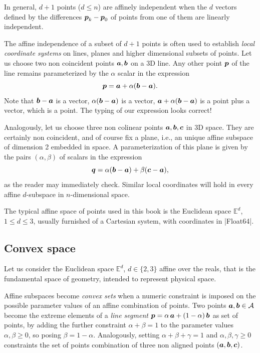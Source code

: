 In general, $d+1$ points  ($d \leq n$) are affinely independent when the $d$ vectors defined by the differences ${\mbox{\boldmath $p$}}_k - {\mbox{\boldmath $p$}}_0$ of points from one of them are linearly independent. 

The affine independence of a subset of $d+1$ points is often used to establish \emph{local coordinate systems} on lines, planes and higher dimensional subsets of points. Let us choose two non coincident points ${\mbox{\boldmath $a$}},{\mbox{\boldmath $b$}}$ on a 3D line. Any other point ${\mbox{\boldmath $p$}}$ of the line remains parameterized by the $\alpha$ scalar in the expression 
\[
{\mbox{\boldmath $p$}} = {\mbox{\boldmath $a$}} + \alpha({\mbox{\boldmath $b$}}-{\mbox{\boldmath $a$}}). 
\]
Note that ${\mbox{\boldmath $b$}}-{\mbox{\boldmath $a$}}$ is a vector, $\alpha({\mbox{\boldmath $b$}}-{\mbox{\boldmath $a$}})$ is a vector, ${\mbox{\boldmath $a$}} + \alpha({\mbox{\boldmath $b$}}-{\mbox{\boldmath $a$}})$ is a point plus a vector, which is a point. The typing of our expression looks correct!

Analogously, let us choose three non colinear points ${\mbox{\boldmath $a$}},{\mbox{\boldmath $b$}},{\mbox{\boldmath $c$}}$ in 3D space. They are certainly non coincident, and of course fix a plane, i.e., an unique affine subspace of dimension 2 embedded in space. A parameterization of this plane is given by the pairs $(\alpha,\beta)$ of scalars in the expression
\[
{\mbox{\boldmath $q$}} = \alpha({\mbox{\boldmath $b$}}-{\mbox{\boldmath $a$}}) + \beta({\mbox{\boldmath $c$}}-{\mbox{\boldmath $a$}}),
\] 
as the reader may immediately check. Similar local coordinates will hold in every affine $d$-subspace in $n$-dimensional space.

The typical affine space of points used in this book is the Euclidean space $\mathbb{E}^d$, $1 \leq d \leq 3$, usually furnished of a Cartesian system, with coordinates in |Float64|.



\subsection{Convex space}
\label{subsec:2:style}

Let us consider the Euclidean space $\mathbb{E}^d$, $d\in\{2,3\}$ affine over the reals, that is the fundamental space of geometry, intended to represent physical space. 

Affine subspaces become \emph{convex sets} when a numeric constraint is imposed on the possible parameter values of an affine combination of points. Two points ${\mbox{\boldmath $a$}},{\mbox{\boldmath $b$}}\in\mathcal{A}$ become the extreme elements of a \emph{line segment} ${\mbox{\boldmath $p$}} = \alpha\,{\mbox{\boldmath $a$}} + (1-\alpha)\,{\mbox{\boldmath $b$}}$ as set of points, by adding the further constraint $\alpha + \beta=1$ to the parameter values $\alpha,\beta \geq 0$, so posing $\beta=1-\alpha$. Analogously, setting $\alpha + \beta + \gamma = 1$ and $\alpha, \beta, \gamma \geq 0$ constraints the set of points combination of three non aligned points $({\mbox{\boldmath $a$}}, {\mbox{\boldmath $b$}}, {\mbox{\boldmath $c$}})$. 


